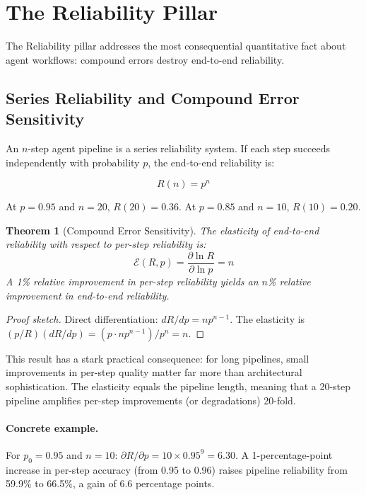 \documentclass[11pt, a4paper, logo, copyright]{googledeepmind}
\newtheorem{theorem}{Theorem}[section]
\begin{document}
\section{The Reliability Pillar}
\label{sec:reliability}

The Reliability pillar addresses the most consequential quantitative fact about agent workflows: compound errors destroy end-to-end reliability.

\subsection{Series Reliability and Compound Error Sensitivity}

An $n$-step agent pipeline is a series reliability system. If each step succeeds independently with probability $p$, the end-to-end reliability is:

\begin{equation}
    R(n) = p^n
\end{equation}

At $p = 0.95$ and $n = 20$, $R(20) = 0.36$. At $p = 0.85$ and $n = 10$, $R(10) = 0.20$.

\begin{theorem}[Compound Error Sensitivity]
\label{thm:compound-sensitivity}
The elasticity of end-to-end reliability with respect to per-step reliability is:
\begin{equation}
    \mathcal{E}(R, p) = \frac{\partial \ln R}{\partial \ln p} = n
\end{equation}
A 1\% relative improvement in per-step reliability yields an $n$\% relative improvement in end-to-end reliability.
\end{theorem}

\begin{proof}[Proof sketch]
Direct differentiation: $dR/dp = n p^{n-1}$. The elasticity is $(p/R)(dR/dp) = (p \cdot n p^{n-1}) / p^n = n$.
\end{proof}

This result has a stark practical consequence: for long pipelines, small improvements in per-step quality matter far more than architectural sophistication. The elasticity equals the pipeline length, meaning that a 20-step pipeline amplifies per-step improvements (or degradations) 20-fold.

\paragraph{Concrete example.} For $p_0 = 0.95$ and $n = 10$: $\partial R/\partial p = 10 \times 0.95^9 = 6.30$. A 1-percentage-point increase in per-step accuracy (from 0.95 to 0.96) raises pipeline reliability from 59.9\% to 66.5\%, a gain of 6.6 percentage points.
\end{document}

